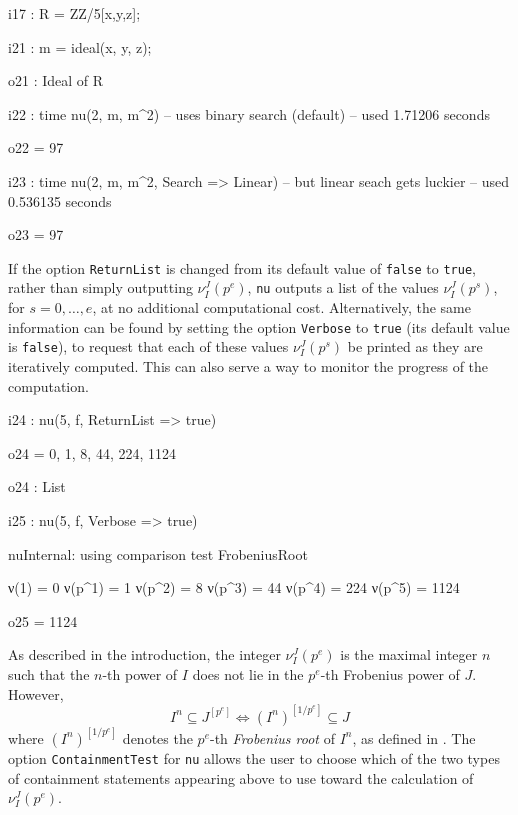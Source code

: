 \documentclass{amsart}
\begin{document}
\bigskip
{\small
{}
\begin{MyVerbatim}
i17 : R = ZZ/5[x,y,z];

i21 : m = ideal(x, y, z);

o21 : Ideal of R

i22 : time nu(2, m, m^2) -- uses binary search (default)
     -- used 1.71206 seconds

o22 = 97

i23 : time nu(2, m, m^2, Search => Linear) -- but linear seach gets luckier
     -- used 0.536135 seconds

o23 = 97
\end{MyVerbatim}
}
\bigskip


If the option \texttt{ReturnList} is changed from its default value of \texttt{false} to \texttt{true}, rather than simply outputting $\nu_I^J(p^e)$, \texttt{nu} outputs a list of the values $\nu_I^J(p^s)$, for $s=0,\ldots,e$, at no additional computational cost.
Alternatively, the same information can be found by setting the option \texttt{Verbose} to \texttt{true} (its default value is \texttt{false}), to request that each of these values $\nu_I^J(p^s)$ be printed as they are iteratively computed.  This can also serve a way to monitor the progress of the computation.

\bigskip
{\small
{}
\begin{MyVerbatim}
i24 : nu(5, f, ReturnList => true)

o24 = {0, 1, 8, 44, 224, 1124}

o24 : List

i25 : nu(5, f, Verbose => true)

nuInternal: using comparison test FrobeniusRoot

ν(1) = 0
ν(p^1) = 1
ν(p^2) = 8
ν(p^3) = 44
ν(p^4) = 224
ν(p^5) = 1124

o25 = 1124
\end{MyVerbatim}
}
\bigskip


As described in the introduction, the integer $\nu_I^J(p^e)$ is the maximal integer $n$ such that the $n$-th power of $I$ does not lie in the $p^e$-th Frobenius power of $J$.  However,
\begin{equation*}
  I^n \subseteq J^{[p^e]} \Longleftrightarrow (I^n)^{[1/p^e]} \subseteq J
\end{equation*}
where $(I^n)^{[1/p^e]}$ denotes the $p^e$-th \emph{Frobenius root} of $I^n$, as defined in \cite{BlickleMustataSmithDiscretenessAndRationalityOfFThresholds}.
The option \texttt{ContainmentTest} for \texttt{nu} allows the user to choose which of the two types of containment statements appearing above to use toward the calculation of $\nu_I^J(p^e)$.
\end{document}
